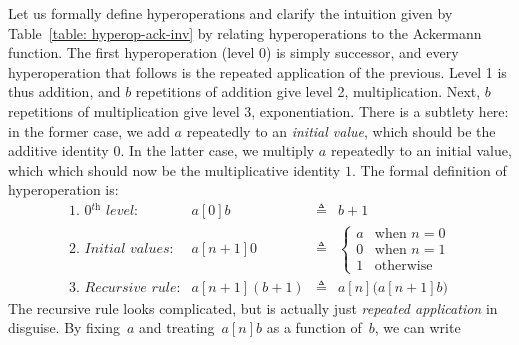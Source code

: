 Let us formally define hyperoperations and clarify the intuition
given by Table~\ref{table: hyperop-ack-inv} by relating hyperoperations to
the Ackermann function.
The first hyperoperation (level 0) is simply successor, and
every hyperoperation that follows is the repeated application of the previous.
Level 1 is thus addition, and $b$ repetitions of addition
give level 2, multiplication. Next, $b$ repetitions of
multiplication give level 3, exponentiation.
There is a subtlety here: in the former case, we add $a$
repeatedly to an \emph{initial value}, which should be the additive identity $0$.
In the latter case, we multiply $a$ repeatedly to an initial value, which
which should now be the multiplicative identity $1$. The formal definition of hyperoperation is:
\begin{equation}
\label{eq:hyper}
\begin{array}{lrcl}
\textit{1. 0$^{\textit{th}}$ level:} & a[0]b & \triangleq & b + 1 \\
\textit{2. Initial values:} & a[n+1]0 & \triangleq &
  \begin{cases}
    a & \text{when } n = 0 \\
    0 & \text{when } n = 1 \\
    1 & \text{otherwise}
  \end{cases} \\
\textit{3. Recursive rule:} & a[n+1](b+1) & \triangleq & a[n]\big(a[n+1]b\big)
\end{array}
\end{equation}
The recursive rule looks complicated, but is actually just \emph{repeated application} in disguise. By fixing~$a$ and treating~$a[n]b$ as a function of~$b$, we can write

